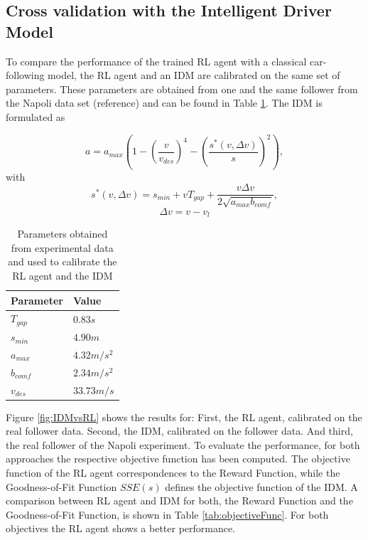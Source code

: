 \documentclass[review]{elsarticle}
\begin{document}
\subsection{Cross validation with the Intelligent Driver Model}
To compare the performance of the trained RL agent with a classical car-following model, the RL agent and an IDM are calibrated on the same set of parameters. These parameters are obtained from one and the same follower from the Napoli data set (reference) and can be found in Table \ref{tab:IDMparameters}. The IDM is formulated as 

\begin{equation}
a=a_{max}\left(1-\left(\frac{v}{v_{des}}\right)^{4}-\left(\frac{s^{*}\left(v, \Delta v\right)}{s}\right)^{2}\right),
\end{equation}
with
\begin{equation}
s^{*}\left(v, \Delta v\right)=s_{min}+vT_{gap}+\frac{v \Delta v}{2 \sqrt{a_{max} b_{comf}}},
\end{equation}
\begin{equation}
\Delta v = v-v_l
\end{equation}

\begin{table}
	\caption{Parameters obtained from experimental data and used to calibrate the RL agent and the IDM} 
	\label{tab:IDMparameters} 
	\begin{center}
		\begin{tabular}{ p{} |p{}  } 
		Parameter & Value   \\ \hline
			$T_{gap}$ & $0.83s$\\
			$s_{min}$ & $4.90m$\\
			$a_{max}$ & $4.32m/s^2$\\
			$b_{comf}$ & $2.34 m/s^2$\\
			$v_{des}$ & $33.73m/s$
			
		\end{tabular}
	\end{center}
\end{table}

Figure \ref{fig:IDMvsRL} shows the results for: First, the RL agent, calibrated on the real follower data. Second, the IDM, calibrated on the follower data. And third, the real follower of the Napoli experiment. To evaluate the performance, for both approaches the respective objective function has been computed. The objective function of the RL agent correspondences to the Reward Function, while the Goodness-of-Fit Function $SSE(s)$ defines the objective function of the IDM. A comparison between RL agent and IDM for both, the Reward Function and the Goodness-of-Fit Function, is shown in Table \ref{tab:objectiveFunc}. For both objectives the RL agent shows a better performance.
\end{document}
